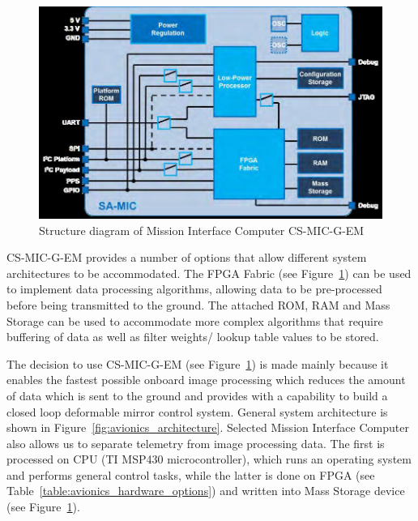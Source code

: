 \documentclass[12pt]{article}
\begin{document}
\begin{figure}[ht]
\centering
  \includegraphics[width=5in]{images/Avionics_fig1.png}
\caption{Structure diagram of Mission Interface Computer CS-MIC-G-EM  \cite{avionics_clyde_space}}
\label{fig:avionics_MIC}
\end{figure}

CS-MIC-G-EM provides a number of options that allow different system architectures to be accommodated. The FPGA Fabric (see Figure~\ref{fig:avionics_MIC}) can be used to implement data processing algorithms, allowing data to be pre-processed before being transmitted to the ground. The attached ROM, RAM and Mass Storage can be used to accommodate more complex algorithms that require buffering of data as well as filter weights/ lookup table values to be stored.

The decision to use CS-MIC-G-EM (see Figure~\ref{fig:avionics_MIC}) is made mainly because it enables the fastest possible onboard image processing \cite{avionics_FPGA} which reduces the amount of data which is sent to the ground and provides with a capability to build a closed loop deformable mirror control system.
General system architecture is shown in Figure~\ref{fig:avionics_architecture}. Selected Mission Interface Computer also allows us to separate telemetry from image processing data. The first is processed on CPU (TI MSP430 microcontroller), which runs an operating system and performs general control tasks, while the latter is done on FPGA (see Table~\ref{table:avionics_hardware_options}) and written into Mass Storage device (see Figure~\ref{fig:avionics_MIC}).
\end{document}

